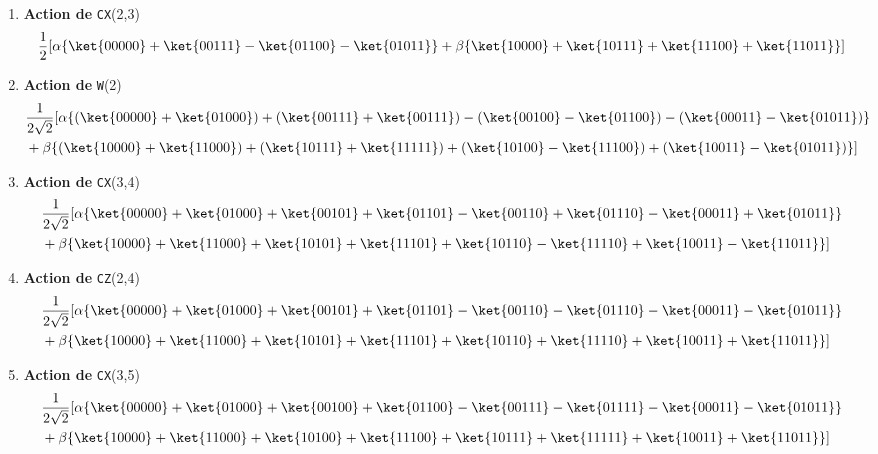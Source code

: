 \begin{enumerate}
\begin{enumerate}
\item\textbf{Action de} \texttt{CX}(2,3)
\begin{equation}
	\frac{1}{2}[\alpha\{\ket{00000} +\ket{00111} -\ket{01100} -\ket{01011}\}
+\beta\{\ket{10000} +\ket{10111}+\ket{11100} +\ket{11011}\}  ]
\end{equation}

\item\textbf{Action de} \texttt{W}(2)
\begin{equation}
\begin{split}
&\frac{1}{2\sqrt{2}}[\alpha\{(\ket{00000}+\ket{01000})+(\ket{00111}+\ket{00111})
-(\ket{00100} -\ket{01100})-(\ket{00011} -\ket{01011})\}\\
&  +\beta\{(\ket{10000} +\ket{11000})+(\ket{10111} +\ket{11111})+(\ket{10100}
-\ket{11100})+(\ket{10011} -\ket{01011})\}]
\end{split}
\end{equation}
\item\textbf{Action de} \texttt{CX}(3,4)
\begin{equation}
\begin{split}
&\frac{1}{2\sqrt{2}}[\alpha\{\ket{00000} +\ket{01000} +\ket{ 00101} +\ket{01101}
-\ket{00110} +\ket{01110} -\ket{ 00011} +\ket{01011}\} \\
& +\beta\{\ket{10000} +\ket{11000} +\ket{10101} +\ket{11101} +\ket{ 10110}
-\ket{11110} +\ket{ 10011} -\ket{11011}\} ]
\end{split}
\end{equation}

\item\textbf{Action de} \texttt{CZ}(2,4)
\begin{equation}
\begin{split}
&\frac{1}{2\sqrt{2}}[\alpha\{ \ket{00000} +\ket{01000} +\ket{ 00101}
+\ket{01101} -\ket{ 00110} -\ket{01110} -\ket{ 00011} -\ket{01011}\} \\
& +\beta\{\ket{10000} +\ket{11000} +\ket{10101} +\ket{11101} +\ket{ 10110}
+\ket{11110} +\ket{ 10011} +\ket{11011}\} ]
\end{split}
\end{equation}

\item\textbf{Action de} \texttt{CX}(3,5)
\begin{equation}
\begin{split}
& \frac{1}{2\sqrt{2}}[\alpha\{ \ket{00000} +\ket{01000} +\ket{ 00100}
+\ket{01100} -\ket{ 00111} -\ket{01111} -\ket{ 00011} -\ket{01011}\} \\
& +\beta\{\ket{10000} +\ket{11000} +\ket{10100} +\ket{11100} +\ket{ 10111}
+\ket{11111} +\ket{ 10011} +\ket{11011}\} ]
\end{split}
\end{equation}


\end{enumerate}
\end{enumerate}
